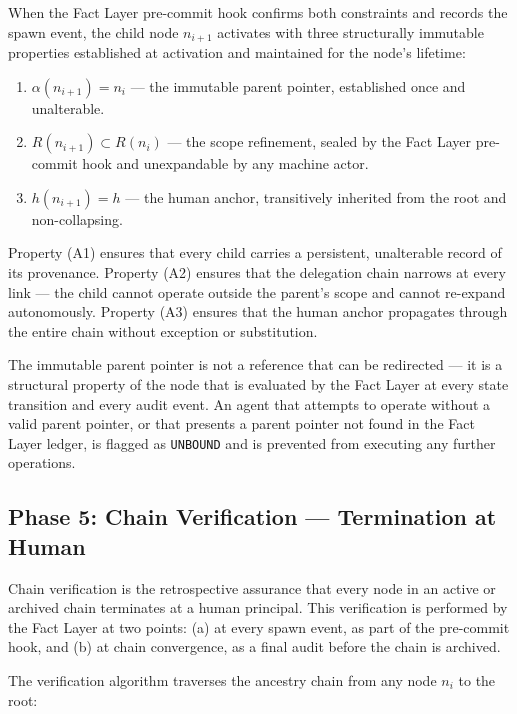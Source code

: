 When the Fact Layer pre-commit hook confirms both constraints and records the spawn event, the child node $n_{i+1}$ activates with three structurally immutable properties established at activation and maintained for the node's lifetime:

\begin{enumerate}
    \item[(A1)] $\alpha(n_{i+1}) = n_i$ — the immutable parent pointer, established once and unalterable.
    \item[(A2)] $R(n_{i+1}) \subset R(n_i)$ — the scope refinement, sealed by the Fact Layer pre-commit hook and unexpandable by any machine actor.
    \item[(A3)] $h(n_{i+1}) = h$ — the human anchor, transitively inherited from the root and non-collapsing.
\end{enumerate}

Property (A1) ensures that every child carries a persistent, unalterable record of its provenance. Property (A2) ensures that the delegation chain narrows at every link — the child cannot operate outside the parent's scope and cannot re-expand autonomously. Property (A3) ensures that the human anchor propagates through the entire chain without exception or substitution.

The immutable parent pointer is not a reference that can be redirected — it is a structural property of the node that is evaluated by the Fact Layer at every state transition and every audit event. An agent that attempts to operate without a valid parent pointer, or that presents a parent pointer not found in the Fact Layer ledger, is flagged as \texttt{UNBOUND} and is prevented from executing any further operations.

\subsection{Phase 5: Chain Verification — Termination at Human}
\label{sec:rs-phase5}

Chain verification is the retrospective assurance that every node in an active or archived chain terminates at a human principal. This verification is performed by the Fact Layer at two points: (a) at every spawn event, as part of the pre-commit hook, and (b) at chain convergence, as a final audit before the chain is archived.

The verification algorithm traverses the ancestry chain from any node $n_i$ to the root:

